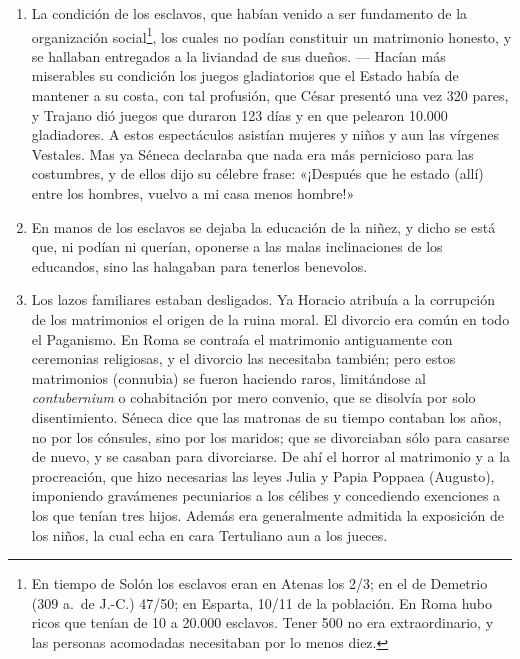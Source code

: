 \raggedbottom{} \documentclass[12pt, a4paper, openany]{book} %
\begin{document}
\begin{enumerate}
\begin{enumerate}
          \item La condición de los esclavos, que habían venido a ser fundamento de la organización social\footnote{En tiempo de Solón los esclavos eran en Atenas los 2/3; en el de Demetrio (309 a.\ de J.-C.) 47/50; en Esparta, 10/11 de la población. En Roma hubo ricos que tenían de 10 a 20.000 esclavos. Tener 500 no era extraordinario, y las personas acomodadas necesitaban por lo menos diez.}, los cuales no podían constituir un matrimonio honesto, y se hallaban entregados a la liviandad de sus dueños. --- Hacían más miserables su condición los juegos gladiatorios que el Estado había de mantener a su costa, con tal profusión, que César presentó una vez 320 pares, y Trajano dió juegos que duraron 123 días y en que pelearon 10.000 gladiadores. A estos espectáculos asistían mujeres y niños y aun las vírgenes Vestales. Mas ya Séneca declaraba que nada era más pernicioso para las costumbres, y de ellos dijo su célebre frase: «¡Después que he estado (allí) entre los hombres, vuelvo a mi casa menos hombre!»
          \item En manos de los esclavos se dejaba la educación de la niñez, y dicho se está que, ni podían ni querían, oponerse a las malas inclinaciones de los educandos, sino las halagaban para tenerlos benevolos.
          \item Los lazos familiares estaban desligados. Ya Horacio atribuía a la corrupción de los matrimonios el origen de la ruina moral. El divorcio era común en todo el Paganismo. En Roma se contraía el matrimonio antiguamente con ceremonias religiosas, y el divorcio las necesitaba también; pero estos matrimonios (connubia) se fueron haciendo raros, limitándose al \textit{contubernium} o cohabitación por mero convenio, que se disolvía por solo disentimiento. Séneca dice que las matronas de su tiempo contaban los años, no por los cónsules, sino por los maridos; que se divorciaban sólo para casarse de nuevo, y se casaban para divorciarse. De ahí el horror al matrimonio y a la procreación, que hizo necesarias las leyes Julia y Papia Poppaea (Augusto), imponiendo gravámenes pecuniarios a los célibes y concediendo exenciones a los que tenían tres hijos. Además era generalmente admitida la exposición de los niños, la cual echa en cara Tertuliano aun a los jueces.

\end{enumerate}
\end{enumerate}
\end{document}
